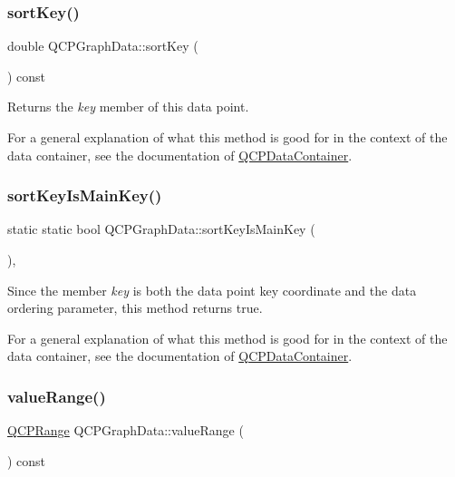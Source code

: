 \subsubsection{\texorpdfstring{sort\+Key()}{sortKey()}}
{\footnotesize\ttfamily double Q\+C\+P\+Graph\+Data\+::sort\+Key (\begin{DoxyParamCaption}{ }\end{DoxyParamCaption}) const\hspace{0.3cm}{\ttfamily [inline]}}

Returns the {\itshape key} member of this data point.

For a general explanation of what this method is good for in the context of the data container, see the documentation of \mbox{\hyperlink{class_q_c_p_data_container}{Q\+C\+P\+Data\+Container}}. \mbox{\label{class_q_c_p_graph_data_a1c98dfd21b82321a173db4ff860dfd21}} 
\subsubsection{\texorpdfstring{sort\+Key\+Is\+Main\+Key()}{sortKeyIsMainKey()}}
{\footnotesize\ttfamily static static bool Q\+C\+P\+Graph\+Data\+::sort\+Key\+Is\+Main\+Key (\begin{DoxyParamCaption}{ }\end{DoxyParamCaption})\hspace{0.3cm}{\ttfamily [inline]}, {\ttfamily [static]}}

Since the member {\itshape key} is both the data point key coordinate and the data ordering parameter, this method returns true.

For a general explanation of what this method is good for in the context of the data container, see the documentation of \mbox{\hyperlink{class_q_c_p_data_container}{Q\+C\+P\+Data\+Container}}. \mbox{\label{class_q_c_p_graph_data_a2f8dd30360356f66cc418a170a9f3792}} 
\subsubsection{\texorpdfstring{value\+Range()}{valueRange()}}
{\footnotesize\ttfamily \mbox{\hyperlink{class_q_c_p_range}{Q\+C\+P\+Range}} Q\+C\+P\+Graph\+Data\+::value\+Range (\begin{DoxyParamCaption}{ }\end{DoxyParamCaption}) const\hspace{0.3cm}{\ttfamily [inline]}}

